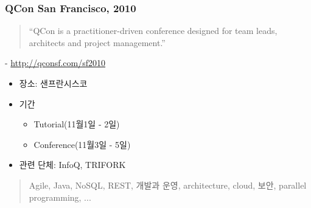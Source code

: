 \begin{frame}
\frametitle{QCon San Francisco, 2010}

\begin{quotation}
``QCon is a practitioner-driven conference designed for team leads, architects and project management.''
\end{quotation}
\hfill - \url{http://qconsf.com/sf2010}

\begin{itemize}
  \item 장소: 샌프란시스코
  \item 기간
    \begin{itemize}
    \item Tutorial(11월1일 - 2일)
    \item Conference(11월3일 - 5일)
    \end{itemize}
  \item 관련 단체: InfoQ, TRIFORK
\end{itemize}

\begin{quote}
Agile, Java, NoSQL, REST, 개발과 운영, architecture, cloud, 보안, parallel programming, ...
\end{quote}

\end{frame}
